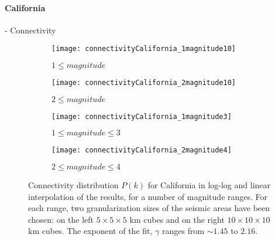 \paragraph{California} - Connectivity
\begin{figure}[!h]
\begin{subfigure}{.99\textwidth}
  \centering
  \texttt{[image: connectivityCalifornia\_1magnitude10]}
  \caption{$1 \leq magnitude$}
  \label{fig:conCa1mag10}
\end{subfigure}%

\begin{subfigure}{.99\textwidth}
  \centering
  \texttt{[image: connectivityCalifornia\_2magnitude10]}
  \caption{$2\leq magnitude$}
  \label{fig:conCa2mag10}
\end{subfigure}%

\begin{subfigure}{.99\textwidth}
  \centering
  \texttt{[image: connectivityCalifornia\_1magnitude3]}
  \caption{$1 \leq magnitude \leq 3$}
  \label{fig:conCa1mag3}
\end{subfigure}%

\begin{subfigure}{.99\textwidth}
  \centering
  \texttt{[image: connectivityCalifornia\_2magnitude4]}
  \caption{$2 \leq magnitude \leq 4$}
  \label{fig:conCa2mag4}
\end{subfigure}%

\caption{Connectivity distribution $P(k)$ for California in log-log and linear interpolation of the results, for a number of magnitude ranges. For each range, two granularization sizes of the seismic areas have been chosen: on the left $5 \times 5 \times5 $ km cubes and on the right $10 \times 10 \times 10$ km cubes. The exponent of the fit, $\gamma$ ranges from $\sim 1.45$ to $2.16$.}
\label{fig:connectivityCa}
\end{figure}

\clearpage

